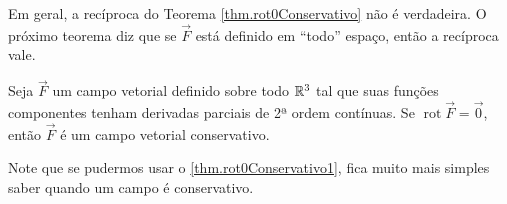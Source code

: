 Em geral, a recíproca do Teorema \ref{thm.rot0Conservativo} não é verdadeira. O próximo teorema diz que se \(\overrightarrow{F}\) está definido em ``todo'' espaço, então a recíproca vale.

\begin{theorem}\label{thm.rot0Conservativo1}
    Seja \(\overrightarrow{F}\) um campo vetorial definido sobre todo \(\mathbb{R}^3\) tal que suas funções componentes tenham derivadas parciais de 2ª ordem contínuas. Se \(\operatorname{rot}\overrightarrow{F} = \overrightarrow{0}\), então \(\overrightarrow{F}\) é um campo vetorial conservativo.
\end{theorem}

\begin{remark}
    Note que se pudermos usar o \ref{thm.rot0Conservativo1}, fica muito mais simples saber quando um campo é conservativo.
\end{remark}


